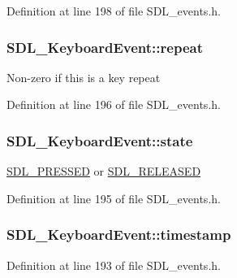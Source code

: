 Definition at line 198 of file S\-D\-L\-\_\-events.\-h.

\hypertarget{struct_s_d_l___keyboard_event_a3edac3b36304812d533795c9df4ed4c1}{
\subsubsection[{repeat}]{ S\-D\-L\-\_\-\-Keyboard\-Event\-::repeat}}\label{struct_s_d_l___keyboard_event_a3edac3b36304812d533795c9df4ed4c1}
Non-\/zero if this is a key repeat 

Definition at line 196 of file S\-D\-L\-\_\-events.\-h.

\hypertarget{struct_s_d_l___keyboard_event_a110558eb96c113c86cfa31a7018c2346}{
\subsubsection[{state}]{ S\-D\-L\-\_\-\-Keyboard\-Event\-::state}}\label{struct_s_d_l___keyboard_event_a110558eb96c113c86cfa31a7018c2346}
\hyperlink{_s_d_l__events_8h_aee81bbffbc8489bdea8fecd1232c4bd1}{S\-D\-L\-\_\-\-P\-R\-E\-S\-S\-E\-D} or \hyperlink{_s_d_l__events_8h_ad680a069f9fcab80de91b3eefdf29c3c}{S\-D\-L\-\_\-\-R\-E\-L\-E\-A\-S\-E\-D} 

Definition at line 195 of file S\-D\-L\-\_\-events.\-h.

\hypertarget{struct_s_d_l___keyboard_event_a3da1d8f6892e7f6ee28d9eafdb5e7d02}{
\subsubsection[{timestamp}]{ S\-D\-L\-\_\-\-Keyboard\-Event\-::timestamp}}\label{struct_s_d_l___keyboard_event_a3da1d8f6892e7f6ee28d9eafdb5e7d02}


Definition at line 193 of file S\-D\-L\-\_\-events.\-h.

